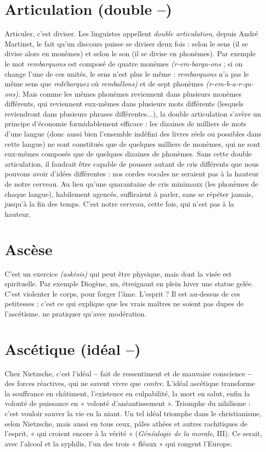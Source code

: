 \section{Articulation (double {\bf --})}
Articuler, c’est diviser. Les linguistes appellent
{\it double articulation}, depuis André Martinet,
le fait qu’un discours puisse se diviser deux fois : selon le sens (il se divise
alors en monèmes) et selon le son (il se divise en phonèmes). Par exemple le mot
{\it rembarquons} est composé de quatre monèmes {\it (r-em-barqu-ons} ; si on change
l'une de ces unités, le sens n’est plus le même : {\it rembarquons} n’a pas le même sens
que {\it redébarquez} où {\it remballons)} et de sept phonèmes {\it (r-em-b-a-r-qu-ons)}. Mais
comme les mêmes phonèmes reviennent dans plusieurs monèmes différents, qui
reviennent eux-mêmes dans plusieurs mots différents (lesquels reviendront dans
plusieurs phrases différentes...), la double articulation s'avère un principe d’économie
formidablement efficace : les dizaines de milliers de mots d’une langue
(donc aussi bien l’ensemble indéfini des livres réels ou possibles dans cette langue)
ne sont constitués que de quelques milliers de monèmes, qui ne sont eux-mêmes
composés que de quelques dizaines de phonèmes. Sans cette double articulation,
il faudrait être capable de pousser autant de cris différents que nous pouvons
avoir d’idées différentes : nos cordes vocales ne seraient pas à la hauteur de notre
cerveau. Au lieu qu’une quarantaine de cris minimaux (les phonèmes de chaque
langue), habilement agencés, suffiraient à parler, sans se répéter jamais, jusqu’à la
fin des temps. C’est notre cerveau, cette fois, qui n’est pas à la hauteur.

\section{Ascèse}
C’est un exercice {\it (askèsis)} qui peut être physique, mais dont la visée
est spirituelle. Par exemple Diogène, nu, étreignant en plein hiver
une statue gelée. C’est violenter le corps, pour forger l'âme. L’esprit ? Il est au-dessus
de ces petitesses ; c’est ce qui explique que les vrais maîtres ne soient pas
dupes de l’ascétisme.
ne pratiquer qu'avec modération.

\section{Ascétique (idéal {\bf --})}
Chez Nietzsche, c’est l’idéal {\bf --} fait de ressentiment
et de mauvaise conscience {\bf --} des forces réactives,
qui ne savent vivre que {\it contre}. L'idéal ascétique transforme la souffrance en
châtiment, l’existence en culpabilité, la mort en salut, enfin la volonté de puissance
en « volonté d’anéantissement ». Triomphe du nihilisme : c’est vouloir
sauver la vie en la niant. Un tel idéal triomphe dans le christianisme, selon
Nietzsche, mais aussi en tous ceux, pâles athées et autres rachitiques de l'esprit,
« qui croient encore à la vérité » ({\it Généalogie de la morale}, III). Ce serait, avec
l'alcool et la syphilis, l’un des trois « fléaux » qui rongent l’Europe.

